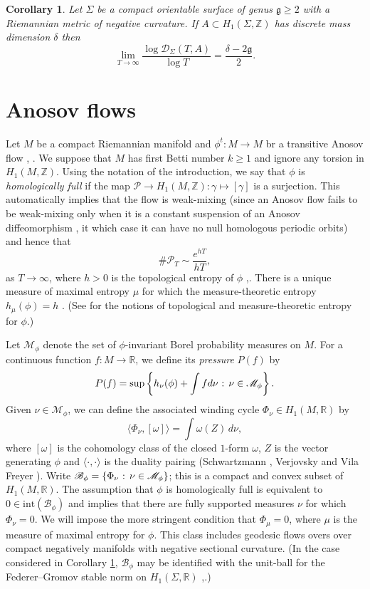\documentclass[11pt]{amsart}
\newtheorem{corollary}[theorem]{Corollary}%
\theoremstyle{definition}
\numberwithin{equation}{section}
\numberwithin{theorem}{section}
\def\Z{\mathbb{Z}}
\def\R{\mathbb{R}}
\begin{document}
\begin{corollary}\label{cor:surfaces}
Let $\Sigma$ be a compact orientable surface of genus $\mathfrak g \ge 2$ with a Riemannian
metric of negative curvature.
If $A \subset H_1(\Sigma,\Z)$ has discrete mass dimension $\delta$ then
\[
\lim_{T \to \infty} \frac{\log \mathscr D_{\Sigma}(T,A)}{\log T} = \frac{\delta -2\mathfrak g}{2}.
\]
\end{corollary}





\section{Anosov flows}\label{sec:anosov}

Let $M$ be a compact Riemannian manifold and $\phi^t : M \to M$ br a transitive
Anosov flow \cite{anosov}, \cite{fisher}. 
We suppose that $M$ has first Betti number $k \ge 1$ and ignore any torsion in 
$H_1(M,\Z)$.
Using the notation of the introduction, we say that
$\phi$ is \emph{homologically full} if the map $\mathscr P \to H_1(M,\Z) : \gamma \mapsto
[\gamma]$ is a surjection. This automatically implies that the flow is weak-mixing 
(since an Anosov flow fails to be weak-mixing only when it is a constant
suspension of an Anosov diffeomorphism \cite{plante}, it which case it can have no
null homologous periodic orbits) and hence that
\[
\#\mathscr P_T \sim \frac{e^{hT}}{hT},
\]
as $T \to \infty$, where $h>0$ is the topological entropy of $\phi$ \cite{margulis1},\cite{PP83}. 
There is a unique measure of maximal entropy $\mu$ for which 
the measure-theoretic entropy 
$h_\mu(\phi) =h$ \cite{Bowen_max}. (See \cite{fisher} for the notions of topological and measure-theoretic entropy for $\phi$.)

Let $\mathscr M_\phi$ denote the set of $\phi$-invariant Borel probability measures on $M$.
For a continuous function $f : M \to \R$, we define its \emph{pressure} $P(f)$ by
\[
P(f) = \sup\left\{h_\nu(\phi) + \int f d\nu \hbox{ : } \nu \in \mathscr M_\phi\right\}.
\]
Given $\nu \in \mathscr M_\phi$, we can define the associated
winding cycle $\Phi_\nu \in H_1(M,\R)$ by
\[
\langle \Phi_\nu, [\omega] \rangle = \int \omega(Z) \, d\nu,
\]
where $[\omega]$ is the cohomology class of the closed $1$-form $\omega$,
$Z$ is the vector generating $\phi$ and $\langle \cdot,\cdot \rangle$ is the duality pairing
(Schwartzmann \cite{Sch}, Verjovsky and Vila Freyer \cite{VV}).
Write $\mathscr B_\phi = \{\Phi_\nu \hbox{ : } \nu \in \mathscr M_\phi\}$;
this is a compact and convex subset of $H_1(M,\R)$.
The assumption that $\phi$ is homologically full 
is equivalent to $0 \in \mathrm{int}(\mathscr{B}_\phi)$ and
implies that there are fully supported measures
$\nu$ for which $\Phi_\nu =0$. We will impose the more stringent condition that $\Phi_\mu=0$, where $\mu$ is the measure of maximal entropy for $\phi$. 
This class includes geodesic flows overs over compact negatively manifolds with
negative sectional curvature. (In the case
considered in Corollary \ref{cor:surfaces}, $\mathscr B_\phi$ may be identified with the
unit-ball for the Federer--Gromov stable norm on $H_1(\Sigma,\R)$ \cite{Fed},\cite{Gromov}.)
\end{document}
